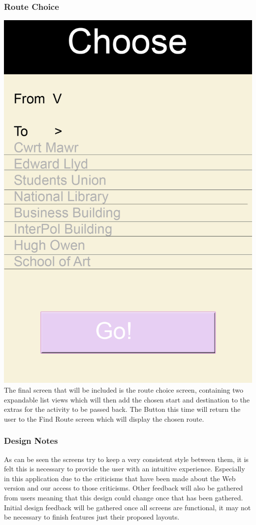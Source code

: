 \documentclass[10pt,a4paper]{article}
\begin{document}
\subsubsection{Route Choice}
\includegraphics[scale=0.6]{Choose.png}\\
The final screen that will be included is the route choice screen, containing two expandable list views which will then add the chosen start and destination to the extras for the activity to be passed back. The Button this time will return the user to the Find Route screen which will display the chosen route. 
\subsubsection{Design Notes}
As can be seen the screens try to keep a very consistent style between them, it is felt this is necessary to provide the user with an intuitive experience. Especially in this application due to the criticisms that have been made about the Web version and our access to those criticisms. Other feedback will also be gathered from users meaning that this design could change once that has been gathered. Initial design feedback will be gathered once all screens are functional, it may not be necessary to finish features just their proposed layouts.
\end{document}
